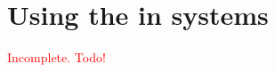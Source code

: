 \documentclass[class=report,11pt,crop=false]{standalone}
\begin{document}
\section{Using the  in  systems \label{sect:proofs_ofdm-dft}}

\textcolor{red}{Incomplete. Todo!}








\ifstandalone
% 
\fi
\end{document}
